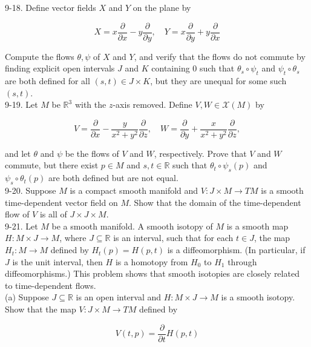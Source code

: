 \documentclass[10pt]{article}
\begin{document}
9-18. Define vector fields $X$ and $Y$ on the plane by

$$
X=x \frac{\partial}{\partial x}-y \frac{\partial}{\partial y}, \quad Y=x \frac{\partial}{\partial y}+y \frac{\partial}{\partial x}
$$

Compute the flows $\theta, \psi$ of $X$ and $Y$, and verify that the flows do not commute by finding explicit open intervals $J$ and $K$ containing 0 such that $\theta_{s} \circ \psi_{t}$ and $\psi_{t} \circ \theta_{s}$ are both defined for all $(s, t) \in J \times K$, but they are unequal for some such $(s, t)$.\\
9-19. Let $M$ be $\mathbb{R}^{3}$ with the $z$-axis removed. Define $V, W \in \mathscr{X}(M)$ by

$$
V=\frac{\partial}{\partial x}-\frac{y}{x^{2}+y^{2}} \frac{\partial}{\partial z}, \quad W=\frac{\partial}{\partial y}+\frac{x}{x^{2}+y^{2}} \frac{\partial}{\partial z},
$$

and let $\theta$ and $\psi$ be the flows of $V$ and $W$, respectively. Prove that $V$ and $W$ commute, but there exist $p \in M$ and $s, t \in \mathbb{R}$ such that $\theta_{t} \circ \psi_{s}(p)$ and $\psi_{s} \circ \theta_{t}(p)$ are both defined but are not equal.\\
9-20. Suppose $M$ is a compact smooth manifold and $V: J \times M \rightarrow T M$ is a smooth time-dependent vector field on $M$. Show that the domain of the time-dependent flow of $V$ is all of $J \times J \times M$.\\
9-21. Let $M$ be a smooth manifold. A smooth isotopy of $M$ is a smooth map $H: M \times J \rightarrow M$, where $J \subseteq \mathbb{R}$ is an interval, such that for each $t \in J$, the map $H_{t}: M \rightarrow M$ defined by $H_{t}(p)=H(p, t)$ is a diffeomorphism. (In particular, if $J$ is the unit interval, then $H$ is a homotopy from $H_{0}$ to $H_{1}$ through diffeomorphisms.) This problem shows that smooth isotopies are closely related to time-dependent flows.\\
(a) Suppose $J \subseteq \mathbb{R}$ is an open interval and $H: M \times J \rightarrow M$ is a smooth isotopy. Show that the map $V: J \times M \rightarrow T M$ defined by

$$
V(t, p)=\frac{\partial}{\partial t} H(p, t)
$$
\end{document}
